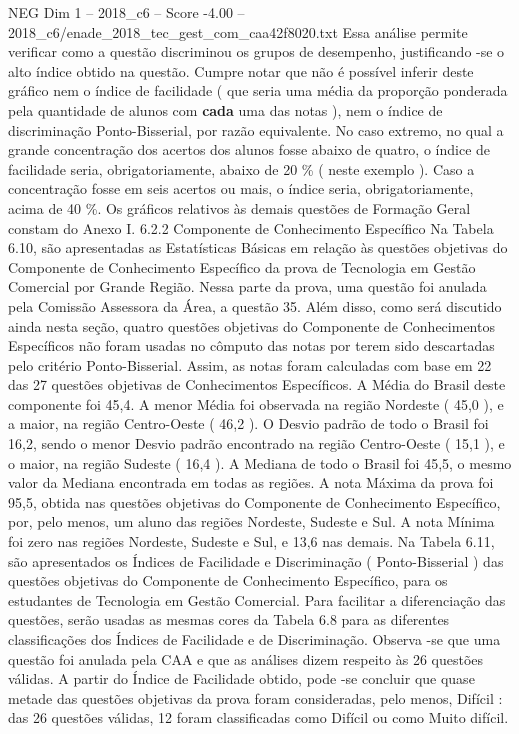\begin{textsample}{NEG Dim 1 – 2018\_c6 – Score -4.00 – 2018\_c6/enade\_2018\_tec\_gest\_com\_caa42f8020.txt}
Essa análise permite verificar como a questão discriminou os grupos de desempenho, justificando -se o alto índice obtido na questão.
Cumpre notar que não é possível inferir deste gráfico nem o índice de facilidade ( que seria uma média da proporção ponderada pela quantidade de alunos com \textbf{cada} uma das notas ), nem o índice de discriminação Ponto-Bisserial, por razão equivalente.
No caso extremo, no qual a grande concentração dos acertos dos alunos fosse abaixo de quatro, o índice de facilidade seria, obrigatoriamente, abaixo de 20 \% ( neste exemplo ).
Caso a concentração fosse em seis acertos ou mais, o índice seria, obrigatoriamente, acima de 40 \%.
Os gráficos relativos às demais questões de Formação Geral constam do Anexo I. 6.2.2 Componente de Conhecimento Específico Na Tabela 6.10, são apresentadas as Estatísticas Básicas em relação às questões objetivas do Componente de Conhecimento Específico da prova de Tecnologia em Gestão Comercial por Grande Região.
Nessa parte da prova, uma questão foi anulada pela Comissão Assessora da Área, a questão 35.
Além disso, como será discutido ainda nesta seção, quatro questões objetivas do Componente de Conhecimentos Específicos não foram usadas no cômputo das notas por terem sido descartadas pelo critério Ponto-Bisserial.
Assim, as notas foram calculadas com base em 22 das 27 questões objetivas de Conhecimentos Específicos.
A Média do Brasil deste componente foi 45,4.
A menor Média foi observada na região Nordeste ( 45,0 ), e a maior, na região Centro-Oeste ( 46,2 ).
O Desvio padrão de todo o Brasil foi 16,2, sendo o menor Desvio padrão encontrado na região Centro-Oeste ( 15,1 ), e o maior, na região Sudeste ( 16,4 ).
A Mediana de todo o Brasil foi 45,5, o mesmo valor da Mediana encontrada em todas as regiões.
A nota Máxima da prova foi 95,5, obtida nas questões objetivas do Componente de Conhecimento Específico, por, pelo menos, um aluno das regiões Nordeste, Sudeste e Sul.
A nota Mínima foi zero nas regiões Nordeste, Sudeste e Sul, e 13,6 nas demais.
Na Tabela 6.11, são apresentados os Índices de Facilidade e Discriminação ( Ponto-Bisserial ) das questões objetivas do Componente de Conhecimento Específico, para os estudantes de Tecnologia em Gestão Comercial.
Para facilitar a diferenciação das questões, serão usadas as mesmas cores da Tabela 6.8 para as diferentes classificações dos Índices de Facilidade e de Discriminação.
Observa -se que uma questão foi anulada pela CAA e que as análises dizem respeito às 26 questões válidas.
A partir do Índice de Facilidade obtido, pode -se concluir que quase metade das questões objetivas da prova foram consideradas, pelo menos, Difícil : das 26 questões válidas, 12 foram classificadas como Difícil ou como Muito difícil.

\end{textsample}
